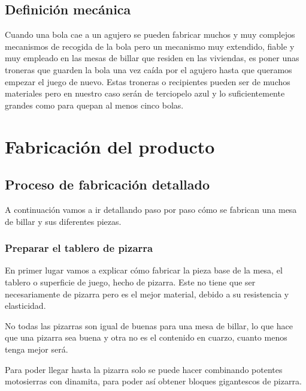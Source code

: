 	\subsection {Definición mecánica}
		    Cuando una bola cae a un agujero se pueden fabricar muchos y muy complejos mecanismos de recogida de la bola pero un mecanismo muy extendido,
		    fiable y muy empleado en las mesas de billar que residen en las viviendas, es poner unas troneras que guarden la bola una vez caída por el agujero hasta que queramos empezar
		    el juego de nuevo. Estas troneras o recipientes pueden ser de muchos materiales pero en nuestro caso serán de terciopelo azul  y lo suficientemente grandes como para quepan al menos cinco  bolas. 

\clearpage
\section {Fabricación del producto}

	\subsection {Proceso de fabricación detallado}
		A  continuación vamos a  ir detallando paso por paso cómo se fabrican una mesa de billar y sus diferentes piezas.
		
		\subsubsection {Preparar el tablero de pizarra}
			En primer lugar vamos a explicar cómo fabricar la pieza base de la mesa, el tablero o superficie de juego, hecho de pizarra. Este no tiene que ser necesariamente de pizarra pero es el mejor material, debido a  su resistencia y elasticidad.

 No todas las pizarras son igual de buenas para una mesa de billar, lo que hace que una pizarra sea buena y otra no es el contenido en cuarzo, cuanto menos tenga mejor será.

Para poder llegar hasta la pizarra solo se puede hacer combinando potentes motosierras con dinamita, para poder así obtener bloques gigantescos de pizarra.

